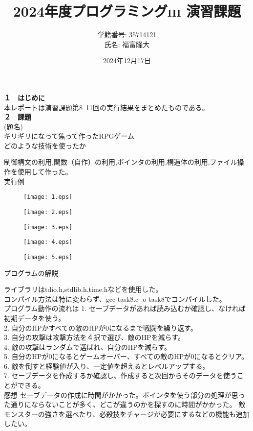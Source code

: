 \documentclass[a4j]{jsarticle}
\title{2024年度プログラミング\textsc{iii} 演習課題}
\author{学籍番号: 35714121 \\ 氏名: 福富隆大}
\date{2024年12月17日}
\begin{document}
\maketitle

\textbf{１　はじめに} \\

本レポートは演習課題第8~11回の実行結果をまとめたものである。\\

\textbf{２　課題} \\

\textmd{(題名)} \\

ギリギリになって焦って作ったRPGゲーム \\

\textmd{どのような技術を使ったか} 

制御構文の利用,関数（自作）の利用,ポインタの利用,構造体の利用,ファイル操作を使用して作った。 \\

\textmd{実行例} 

\begin{figure}[htbp]
  \centering 
  \texttt{[image: 1.eps]}
\end{figure}
\begin{figure}[htbp]
  \centering 
  \texttt{[image: 2.eps]}
\end{figure}
\begin{figure}[htbp]
  \centering 
  \texttt{[image: 3.eps]}
\end{figure}
\begin{figure}[htbp]
  \centering 
  \texttt{[image: 4.eps]}
\end{figure}
\begin{figure}[htbp]
  \centering 
  \texttt{[image: 5.eps]}
\end{figure}

\textmd{プログラムの解説} 

ライブラリはtdio.h,stdlib.h,time.hなどを使用した。\\
コンパイル方法は特に変わらず、gcc task8.c -o task8でコンパイルした。\\
プログラム動作の流れは
1. セーブデータがあれば読み込むか確認し、なければ初期データを使う。\\
2. 自分のHPかすべての敵のHPが0になるまで戦闘を繰り返す。\\
3. 自分の攻撃は攻撃方法を４択で選び、敵のHPを減らす。\\
4. 敵の攻撃はランダムで選ばれ、自分のHPを減らす。\\
5. 自分のHPが0になるとゲームオーバー、すべての敵のHPが0になるとクリア。\\
6. 敵を倒すと経験値が入り、一定値を超えるとレベルアップする。\\
7. セーブデータを作成するか確認し、作成すると次回からそのデータを使うことができる。\\

\textmd{感想} 
セーブデータの作成に時間がかかった。ポインタを使う部分の処理が思った通りにならないことが多く、どこが違うのかを探すのに時間がかかった。
敵モンスターの強さを選べたり、必殺技をチャージが必要にするなどの機能も追加したい。
\end{document}
